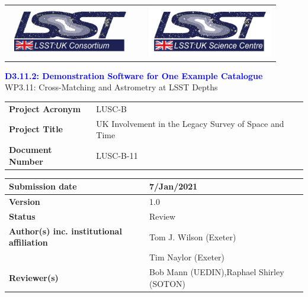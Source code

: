 \documentclass[a4paper,11pt]{scrartcl}
\def\title{D3.11.2: Demonstration Software for One Example Catalogue}
\begin{document}
\begin{center}
\begin{tabular}{p{6cm}p{4cm}p{6cm}}
\includegraphics[width=5.5cm]{lsst-uk_consortium_small.png} & & \includegraphics[width=5.5cm]{lsst-uk_science_centre_small.png} \\
\end{tabular}
\end{center}

\thispagestyle{fancy}
\begin{center}
{\Huge\textcolor{Blue}{\textbf{\title}}}\\[2ex]

{\LARGE\textcolor{BrickRed}{WP3.11: Cross-Matching and Astrometry at LSST Depths}}\\

\end{center}

\begin{table}[ht]
\centering
\renewcommand{\arraystretch}{1.75}
\begin{tabular}{>{\bfseries}p{4.5cm}p{11.5cm}}
Project Acronym & LUSC-B\\
Project Title   & UK Involvement in the Legacy Survey of Space and Time\\
Document Number & LUSC-B-11
\end{tabular}
\end{table}

\begin{table}[ht]
\centering
\renewcommand{\arraystretch}{1.75}
\begin{tabular}{|>{\bfseries}p{4.5cm}|p{11.5cm}|}
\hline
Submission date & 7/Jan/2021 \\\hline
Version & 1.0 \\\hline
Status  & Review \\\hline
\parbox{4cm}{Author(s) inc. institutional affiliation} & Tom J. Wilson (Exeter) \\ & Tim Naylor (Exeter) \\\hline
Reviewer(s) & \parbox{11cm}{\raggedright Bob Mann (UEDIN),\linebreak Raphael Shirley (SOTON)}\\\hline
\end{tabular}\\[2ex]
\end{table}
\end{document}
